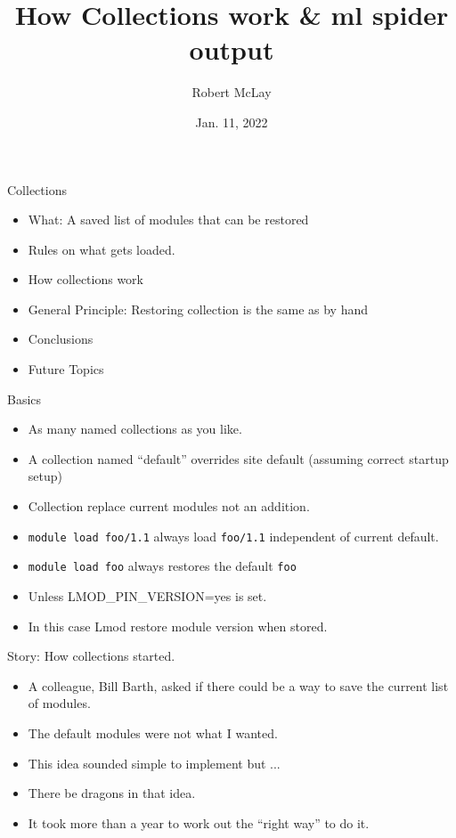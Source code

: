 \documentclass{beamer}
\begin{document}
\title[Lmod]{How Collections work \& ml spider output}
\author{Robert McLay} 
\date{Jan. 11, 2022}

\frame{\titlepage} 


\begin{frame}{Collections}
  \begin{itemize}
    \item What: A saved list of modules that can be restored
    \item Rules on what gets loaded.
    \item How collections work
    \item General Principle: Restoring collection is the same as by hand
    \item Conclusions
    \item Future Topics
  \end{itemize}
\end{frame}

\begin{frame}{Basics}
  \begin{itemize}
    \item As many named collections as you like.
    \item A collection named ``default'' overrides site default
      (assuming correct startup setup)
    \item Collection replace current modules not an addition.
    \item \texttt{module load foo/1.1} always load \texttt{foo/1.1}
      independent of current default.
    \item \texttt{module load foo} always restores the default
      \texttt{foo}
    \item Unless LMOD\_PIN\_VERSION=yes is set. 
    \item In this case Lmod restore module version when stored.
  \end{itemize}
\end{frame}


\begin{frame}{Story: How collections started.}
  \begin{itemize}
    \item A colleague, Bill Barth, asked if there could be a way to
      save the current list of modules.
    \item The default modules were not what I wanted.
    \item This idea sounded simple to implement but ...
    \item There be dragons in that idea.
    \item It took more than a year to work out the ``right way'' to do it.
  \end{itemize}
\end{frame}
\end{document}
